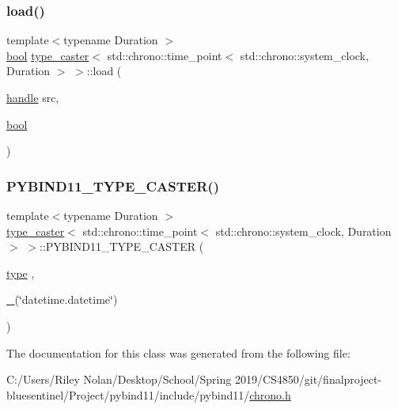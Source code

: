 \subsubsection{\texorpdfstring{load()}{load()}}
{\footnotesize\ttfamily template$<$typename Duration $>$ \\
\mbox{\hyperlink{asdl_8h_af6a258d8f3ee5206d682d799316314b1}{bool}} \mbox{\hyperlink{classtype__caster}{type\+\_\+caster}}$<$ std\+::chrono\+::time\+\_\+point$<$ std\+::chrono\+::system\+\_\+clock, Duration $>$ $>$\+::load (\begin{DoxyParamCaption}\item[{\mbox{\hyperlink{classhandle}{handle}}}]{src,  }\item[{\mbox{\hyperlink{asdl_8h_af6a258d8f3ee5206d682d799316314b1}{bool}}}]{ }\end{DoxyParamCaption})\hspace{0.3cm}{\ttfamily [inline]}}

\mbox{\label{classtype__caster_3_01std_1_1chrono_1_1time__point_3_01std_1_1chrono_1_1system__clock_00_01_duration_01_4_01_4_a2b40fcaf6bd75f557fbe809980edbaa8}} 
\subsubsection{\texorpdfstring{PYBIND11\_TYPE\_CASTER()}{PYBIND11\_TYPE\_CASTER()}}
{\footnotesize\ttfamily template$<$typename Duration $>$ \\
\mbox{\hyperlink{classtype__caster}{type\+\_\+caster}}$<$ std\+::chrono\+::time\+\_\+point$<$ std\+::chrono\+::system\+\_\+clock, Duration $>$ $>$\+::P\+Y\+B\+I\+N\+D11\+\_\+\+T\+Y\+P\+E\+\_\+\+C\+A\+S\+T\+ER (\begin{DoxyParamCaption}\item[{\mbox{\hyperlink{classtype__caster_3_01std_1_1chrono_1_1time__point_3_01std_1_1chrono_1_1system__clock_00_01_duration_01_4_01_4_aa6ea8713f4efcca306c1ceb74a2877c7}{type}}}]{,  }\item[{\mbox{\hyperlink{descr_8h_af114703e20c6527e87163eb2798f74b8}{\+\_\+}}(\char`\"{}datetime.\+datetime\char`\"{})}]{ }\end{DoxyParamCaption})}



The documentation for this class was generated from the following file\+:\begin{DoxyCompactItemize}
\item 
C\+:/\+Users/\+Riley Nolan/\+Desktop/\+School/\+Spring 2019/\+C\+S4850/git/finalproject-\/bluesentinel/\+Project/pybind11/include/pybind11/\mbox{\hyperlink{chrono_8h}{chrono.\+h}}\end{DoxyCompactItemize}
